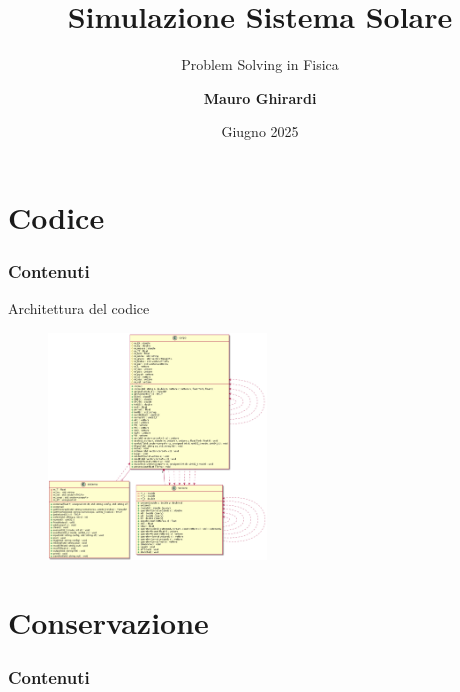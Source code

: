 \documentclass[Serif, 10pt, brown]{beamer}
\subtitle{Problem Solving in Fisica}
\title[{Sistema Solare}]{\sc Simulazione Sistema Solare}
\author[\ul{Mauro Ghirardi}]{{\bf Mauro Ghirardi}}
\institute[UTD]{\sc\small Università degli Studi di Pavia}
\date[UCI]{Giugno 2025}
\theoremstyle{example}
\theoremstyle{plain}
\begin{document}
\frame{\titlepage}
%





\section[Code]{Codice}
    \begin{frame}
        \frametitle{Contenuti}
        \transblindsvertical
        \tableofcontents[currentsection]
    \end{frame}
    
    \begin{frame}{Architettura del codice}
        \begin{figure}
            \centering
            \includegraphics[width=\textwidth, height=6cm]{tutto.png}
            \label{fig:uml}
        \end{figure}
    \end{frame}
    
    

\section[Conserv]{Conservazione}
    \begin{frame}
        \frametitle{Contenuti}
        \transblindsvertical
        \tableofcontents[currentsection]
    \end{frame}
\end{document}
